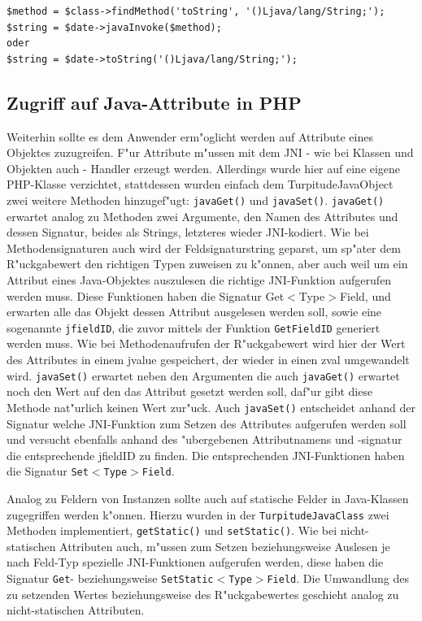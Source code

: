 \begin{lstlisting}[caption=Zwei Arten die gleiche Methode aufzurufen]
$method = $class->findMethod('toString', '()Ljava/lang/String;');
$string = $date->javaInvoke($method);
oder
$string = $date->toString('()Ljava/lang/String;');
\end{lstlisting}

\subsection{Zugriff auf Java-Attribute in PHP}
\label{sec:chap1:impl:7}

Weiterhin sollte es dem Anwender erm"oglicht werden auf Attribute eines Objektes zuzugreifen. F"ur Attribute m"ussen mit dem JNI - wie bei Klassen und Objekten auch -
Handler erzeugt werden. Allerdings wurde hier auf eine eigene PHP-Klasse verzichtet, stattdessen wurden einfach dem TurpitudeJavaObject zwei weitere Methoden hinzugef"ugt: 
\texttt{javaGet()} und \texttt{javaSet()}. \texttt{javaGet()} erwartet analog zu Methoden zwei Argumente, den Namen des Attributes und dessen Signatur, beides als Strings, 
letzteres wieder JNI-kodiert. Wie bei Methodensignaturen auch wird der Feldsignaturstring geparst, um sp"ater dem R"uckgabewert den richtigen Typen zuweisen zu k"onnen, 
aber auch weil um ein Attribut eines Java-Objektes auszulesen die richtige JNI-Funktion aufgerufen werden muss. Diese Funktionen haben die Signatur
Get$<$Type$>$Field, und erwarten alle das Objekt dessen Attribut ausgelesen werden soll, sowie eine sogenannte \texttt{jfieldID}, die zuvor mittels der Funktion
\texttt{GetFieldID} generiert werden muss. Wie bei Methodenaufrufen der R"uckgabewert wird hier der Wert des Attributes in einem jvalue gespeichert, der wieder
in einen zval umgewandelt wird. \texttt{javaSet()} erwartet neben den Argumenten die auch \texttt{javaGet()} erwartet noch den Wert auf den das Attribut gesetzt werden
soll, daf"ur gibt diese Methode nat"urlich keinen Wert zur"uck. Auch \texttt{javaSet()} entscheidet anhand der Signatur welche JNI-Funktion zum Setzen des
Attributes aufgerufen werden soll und versucht ebenfalls anhand des "ubergebenen Attributnamens und -signatur die
entsprechende jfieldID zu finden. Die entsprechenden JNI-Funktionen haben die Signatur \texttt{Set$<$Type$>$Field}.

Analog zu Feldern von Instanzen sollte auch auf statische Felder in Java-Klassen zugegriffen werden k"onnen. Hierzu wurden in der \texttt{TurpitudeJavaClass} zwei Methoden
implementiert, \texttt{getStatic()} und \texttt{setStatic()}. Wie bei nicht-statischen Attributen auch, m"ussen zum Setzen beziehungsweise Auslesen je nach Feld-Typ spezielle 
JNI-Funktionen aufgerufen werden, diese haben die Signatur \texttt{Get}- beziehungsweise \texttt{SetStatic$<$Type$>$Field}. 
Die Umwandlung des zu setzenden Wertes beziehungsweise des R"uckgabewertes geschieht analog zu nicht-statischen Attributen.

